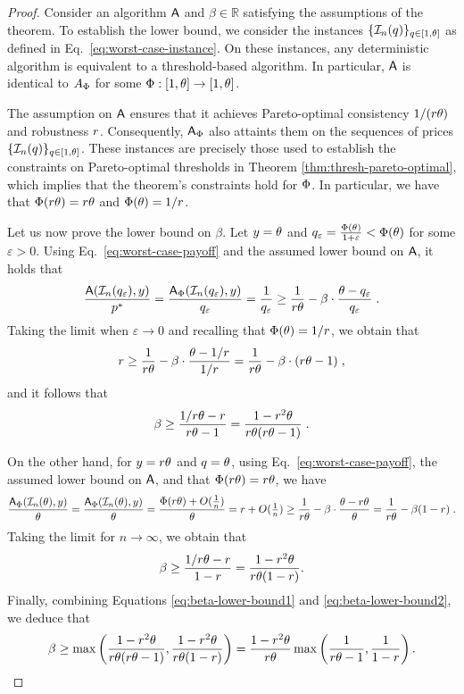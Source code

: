 \begin{proof}
Consider an algorithm $\mbox{\textup{\textsf{A}}}$ and $\beta \in \mathbb{R}$ satisfying the assumptions of the theorem. To establish the lower bound, we consider the instances $\{\mathcal{I}_n(q)\}_{q \in [1,\theta]}$ as defined in Eq.~\eqref{eq:worst-case-instance}. On these instances, any deterministic algorithm is equivalent to a threshold-based algorithm. In particular, $\mbox{\textup{\textsf{A}}}$ is identical to $A_\Phi$ for some $\Phi : [1,\theta] \to [1,\theta]$.  

The assumption on $\mbox{\textup{\textsf{A}}}$ ensures that it achieves Pareto-optimal consistency $1 / (r \theta)$ and robustness $r$. Consequently, $\mbox{\textup{\textsf{A}}}_\Phi$ also attaints them on the sequences of prices $\{\mathcal{I}_n(q)\}_{q \in [1,\theta]}$. These instances are precisely those used to establish the constraints on Pareto-optimal thresholds in Theorem \ref{thm:thresh-pareto-optimal}, which implies that the theorem’s constraints hold for $\Phi$.  In particular, we have that $\Phi(r \theta) = r \theta$ and $\Phi(\theta) = 1/r$. 

Let us now prove the lower bound on $\beta$. Let $y = \theta$ and $q_\varepsilon = \frac{\Phi(\theta)}{1+\varepsilon} < \Phi(\theta)$ for some $\varepsilon > 0$. Using Eq.~\eqref{eq:worst-case-payoff} and the assumed lower bound on $\mbox{\textup{\textsf{A}}}$, it holds that
\[
\frac{\mbox{\textup{\textsf{A}}}(\mathcal{I}_n(q_\varepsilon),y)}{p^*}
= \frac{\mbox{\textup{\textsf{A}}}_\Phi(\mathcal{I}_n(q_\varepsilon),y)}{q_\varepsilon}
= \frac{1}{q_\varepsilon}
\geq \frac{1}{r \theta} - \beta \cdot \frac{\theta - q_\varepsilon}{q_\varepsilon}\;.
\]
Taking the limit when $\varepsilon \to 0$ and recalling that $\Phi(\theta) = 1/r$, we obtain that
\[
r 
\geq \frac{1}{r \theta} - \beta \cdot \frac{\theta - 1/r}{1/r}
= \frac{1}{r \theta} - \beta \cdot (r \theta - 1) \;,
\]
and it follows that
\begin{equation}\label{eq:beta-lower-bound1}
\beta 
\geq \frac{1/r \theta - r}{r \theta - 1}
= \frac{1 - r^2 \theta}{r \theta(r \theta - 1)}\;.
\end{equation}

On the other hand, for $y = r \theta$ and $q = \theta$, using Eq.~\eqref{eq:worst-case-payoff}, the assumed lower bound on $\mbox{\textup{\textsf{A}}}$, and that $\Phi(r \theta) = r \theta$, we have
\[
\frac{\mbox{\textup{\textsf{A}}}_\Phi(\mathcal{I}_n(\theta),y)}{\theta}
= \frac{\mbox{\textup{\textsf{A}}}_\Phi(\mathcal{I}_n(\theta),y)}{\theta}
= \frac{\Phi(r \theta) + O(\tfrac{1}{n})}{\theta}
= r + O(\tfrac{1}{n})
\geq \frac{1}{r \theta} - \beta \cdot \frac{\theta - r \theta}{\theta} 
= \frac{1}{r \theta} - \beta (1 - r)\;.
\]
Taking the limit for $n \to \infty$, we obtain that
\begin{equation}\label{eq:beta-lower-bound2}
\beta 
\geq \frac{1/r \theta - r}{1 - r}
= \frac{1-r^2 \theta}{r \theta(1 - r)}.
\end{equation}
Finally, combining Equations \eqref{eq:beta-lower-bound1} and \eqref{eq:beta-lower-bound2}, we deduce that 
\[
\beta 
\geq \max \left(\frac{1 - r^2 \theta}{r \theta(r \theta - 1)}, \frac{1 - r^2 \theta}{r \theta(1- r)} \right)
= \frac{1-r^2\theta}{r\theta} \max\left( \frac{1}{r \theta - 1}, \frac{1}{1-r} \right).
\]
\end{proof}


